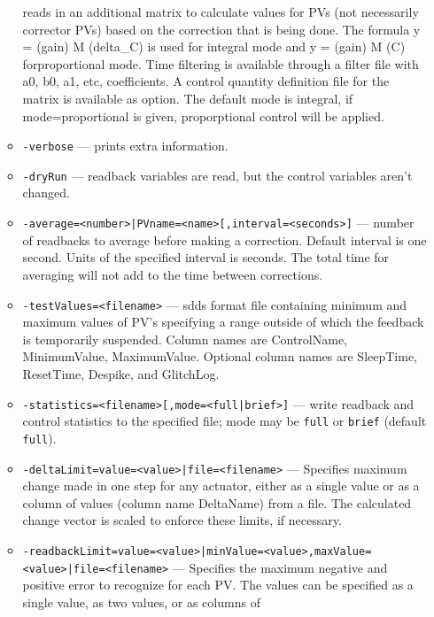 \begin{itemize}
\begin{itemize}
                reads in an additional matrix to calculate values for PVs
               (not necessarily corrector PVs) based
               on the correction that is being done. The formula 
               y = (gain) M (delta\_C) is used for integral mode and 
               y = (gain) M (C) forproportional mode. Time filtering 
               is available through a filter file with 
               a0, b0, a1, etc, coefficients. 
               A control quantity definition file for the matrix 
               is available as option. The default mode is integral, if 
               mode=proportional is given, proporptional control will be applied. 
        \item {\tt -verbose} --- prints extra information.
        \item {\tt -dryRun} --- readback variables are read, but the control variables
               aren't changed.
        \item {\tt -average=<number>|PVname=<name>[,interval=<seconds>]} ---  number of readbacks to average before making a correction.
               Default interval is one second. Units of the specified 
               interval is seconds. The total time for averaging will
               not add to the time between corrections.
        \item {\tt -testValues=<filename>} --- sdds format file containing minimum and maximum values
               of PV's specifying a range outside of which the feedback
               is temporarily suspended. Column names are ControlName,
               MinimumValue, MaximumValue. Optional column names are
               SleepTime, ResetTime, Despike, and GlitchLog.
        \item {\tt -statistics=<filename>[,mode=<full|brief>]} --- write readback and control statistics to the specified file; mode may be \verb|full| or \verb|brief| (default \verb|full|).
        \item {\tt -deltaLimit=value=<value>|file=<filename>} --- Specifies maximum change made in one step for any actuator,
               either as a single value or as a column of values (column name
               DeltaName) from a file. The calculated change vector is scaled
               to enforce these limits, if necessary.
        \item {\tt -readbackLimit=value=<value>|minValue=<value>,maxValue=<value>|file=<filename>} --- Specifies the maximum negative and positive error to
               recognize for each PV. The values can be specified
               as a single value, as two values, or as columns of

\end{itemize}
\end{itemize}
